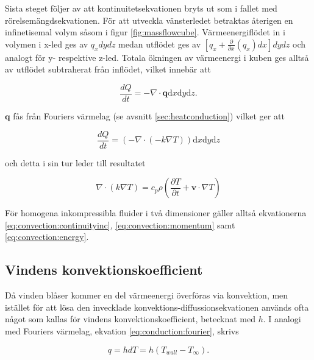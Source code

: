 Sista steget följer av att kontinuitetsekvationen bryts ut som i fallet med rörelsemängdsekvationen. För att utveckla vänsterledet betraktas återigen en infinetisemal volym såsom i figur \ref{fig:massflowcube}. Värmeenergiflödet in i volymen i x-led ges av $q_x dy dz$ medan utflödet ges av $\left[ q_x + \frac{\partial}{\partial x} \left( q_x\right)dx\right]dydz$ och analogt för y- respektive z-led. Totala ökningen av värmeenergi i kuben ges alltså av utflödet subtraherat från inflödet, vilket innebär att

\begin{equation}
\frac{dQ}{dt} = - \nabla \cdot \mathbf{q} \mathrm{d}x\mathrm{d}y\mathrm{d}z.
\end{equation}

$\mathbf{q}$ fås från Fouriers värmelag (se avsnitt \ref{sec:heatconduction}) vilket ger att

\begin{equation}
\label{reynoldsenergytwo}
\frac{dQ}{dt} = \left( - \nabla \cdot \left( -k \nabla T \right) \right)\mathrm{d}x\mathrm{d}y\mathrm{d}z
\end{equation}

och detta i sin tur leder till resultatet

\begin{equation}
\label{eq:convection:energy}\boxed{ \; \; \;
\nabla \cdot \left( k \nabla T \right) = c_p \rho \left( \frac{\partial T}{\partial t} + \mathbf{v}\cdot \nabla T\right)
\; \; \;}
\end{equation}

För homogena inkompressibla fluider i två dimensioner gäller alltså ekvationerna
\eqref{eq:convection:continuityinc}, \eqref{eq:convection:momentum} samt \eqref{eq:convection:energy}.

\subsection{Vindens konvektionskoefficient}

Då vinden blåser kommer en del värmeenergi överföras via konvektion, men istället för att lösa den invecklade konvektions-diffussionsekvationen används ofta något som kallas för vindens konvektionskoefficient, betecknat med $h$. I analogi med Fouriers värmelag, ekvation \ref{eq:conduction:fourier}, skrivs

\begin{equation}\boxed{ \; \; \;
q = hdT = h\left( T_{wall} - T_{\infty}\right).
\; \; \;}\end{equation}

